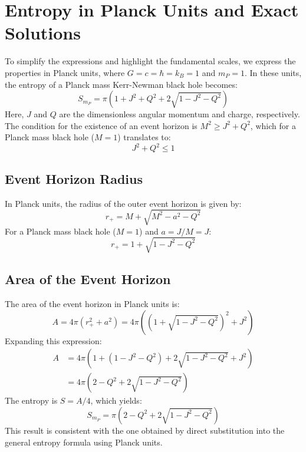 	\section{Entropy in Planck Units and Exact Solutions}
	
	To simplify the expressions and highlight the fundamental scales, we express the properties in Planck units, where $G = c = \hbar = k_B = 1$ and $m_P = 1$. In these units, the entropy of a Planck mass Kerr-Newman black hole becomes:
	$$S_{m_P} = \pi \left( 1 + J^2 + Q^2 + 2 \sqrt{1 - J^2 - Q^2} \right)$$
	Here, $J$ and $Q$ are the dimensionless angular momentum and charge, respectively. The condition for the existence of an event horizon is $M^2 \ge J^2 + Q^2$, which for a Planck mass black hole ($M=1$) translates to:
	\begin{equation}
		J^2 + Q^2 \le 1
		\label{eq:horizon_condition}
	\end{equation}
	
	\subsection{Event Horizon Radius}
	
	In Planck units, the radius of the outer event horizon is given by:
	$$r_+ = M + \sqrt{M^2 - a^2 - Q^2}$$
	For a Planck mass black hole ($M=1$) and $a = J/M = J$:
	\begin{equation}
		r_+ = 1 + \sqrt{1 - J^2 - Q^2}
		\label{eq:horizon_radius}
	\end{equation}
	
	\subsection{Area of the Event Horizon}
	
	The area of the event horizon in Planck units is:
	$$A = 4 \pi (r_+^2 + a^2) = 4 \pi \left( (1 + \sqrt{1 - J^2 - Q^2})^2 + J^2 \right)$$
	Expanding this expression:
	\begin{align*}
		A &= 4 \pi \left( 1 + (1 - J^2 - Q^2) + 2 \sqrt{1 - J^2 - Q^2} + J^2 \right) \\
		&= 4 \pi \left( 2 - Q^2 + 2 \sqrt{1 - J^2 - Q^2} \right)
	\end{align*}
	The entropy is $S = A / 4$, which yields:
	\begin{equation}
		S_{m_P} = \pi \left( 2 - Q^2 + 2 \sqrt{1 - J^2 - Q^2} \right)
		\label{eq:entropy_planck_units}
	\end{equation}
	This result is consistent with the one obtained by direct substitution into the general entropy formula using Planck units.
	
